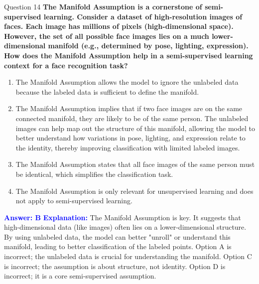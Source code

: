 \documentclass[8pt]{beamer}  %
\begin{document}
	\begin{frame}{Question 14}
		\textbf{The Manifold Assumption is a cornerstone of semi-supervised learning. Consider a dataset of high-resolution images of faces. Each image has millions of pixels (high-dimensional space). However, the set of all possible face images lies on a much lower-dimensional manifold (e.g., determined by pose, lighting, expression). How does the Manifold Assumption help in a semi-supervised learning context for a face recognition task?}
		\begin{enumerate}
			\item The Manifold Assumption allows the model to ignore the unlabeled data because the labeled data is sufficient to define the manifold.
			\item The Manifold Assumption implies that if two face images are on the same connected manifold, they are likely to be of the same person. The unlabeled images can help map out the structure of this manifold, allowing the model to better understand how variations in pose, lighting, and expression relate to the identity, thereby improving classification with limited labeled images.
			\item The Manifold Assumption states that all face images of the same person must be identical, which simplifies the classification task.
			\item The Manifold Assumption is only relevant for unsupervised learning and does not apply to semi-supervised learning.
		\end{enumerate}
		\vspace{0.2cm}
		\textcolor{blue}{\textbf{Answer: B}}
		\vspace{0.2cm}
		\textcolor{blue}{\textbf{Explanation:}} The Manifold Assumption is key. It suggests that high-dimensional data (like images) often lies on a lower-dimensional structure. By using unlabeled data, the model can better "unroll" or understand this manifold, leading to better classification of the labeled points. Option A is incorrect; the unlabeled data is crucial for understanding the manifold. Option C is incorrect; the assumption is about structure, not identity. Option D is incorrect; it is a core semi-supervised assumption.
	\end{frame}
	
\end{document}
